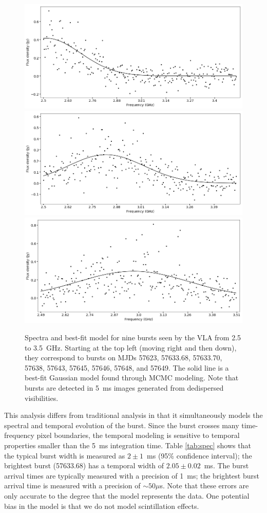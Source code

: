 \documentclass[twocolumn]{aastex61}
\begin{document}
\begin{figure}[ht]
\begin{center}
 \begin{minipage}{2\columnwidth}
  \includegraphics[width=0.33\columnwidth]{spec_57646.png}
  \includegraphics[width=0.33\columnwidth]{spec_57648.png}
  \includegraphics[width=0.33\columnwidth]{spec_57649.png}
 \end{minipage}
\caption{Spectra and best-fit model for nine bursts seen by the VLA from 2.5 to 3.5~GHz. Starting at the top left (moving right and then down), they correspond to bursts on MJDs 57623, 57633.68, 57633.70, 57638, 57643, 57645, 57646, 57648, and 57649. The solid line is a best-fit Gaussian model found through MCMC modeling. Note that bursts are detected in 5~ms images generated from dedispersed visibilities.
\label{fig:spec}}
\end{center}
\end{figure}

This analysis differs from traditional analysis in that it simultaneously models the spectral and temporal evolution of the burst. Since the burst crosses many time-frequency pixel boundaries, the temporal modeling is sensitive to temporal properties smaller than the 5~ms integration time. Table \ref{tab:spec} shows that the typical burst width is measured as $2\pm1$~ms (95\% confidence interval); the brightest burst (57633.68) has a temporal width of $2.05\pm0.02$~ms. The burst arrival times are typically measured with a precision of 1~ms; the brightest burst arrival time is measured with a precision of $\sim50\mu$s. Note that these errors are only accurate to the degree that the model represents the data. One potential bias in the model is that we do not model scintillation effects.
\end{document}
